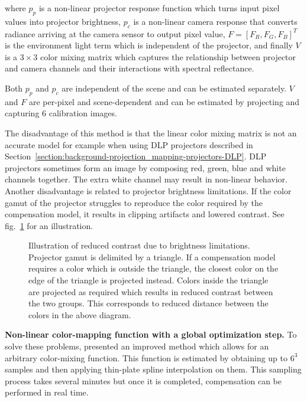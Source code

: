 where \(p_p\) is a non-linear projector response function which turns input pixel values into projector brightness, \(p_c\) is a non-linear camera response that converts radiance arriving at the camera sensor to output pixel value, \(F = [F_R, F_G, F_B]^T\) is the environment light term which is independent of the projector, and finally \(V\) is a \(3 \times 3\) color mixing matrix which captures the relationship between projector and camera channels and their interactions with spectral reflectance.

Both \(p_p\) and \(p_c\) are independent of the scene and can be estimated separately. \(V\) and \(F\) are per-pixel and scene-dependent and can be estimated by projecting and capturing 6 calibration images.

The disadvantage of this method is that the linear color mixing matrix is not an accurate model for example when using DLP projectors described in Section~\ref{section:background-projection_mapping-projectors-DLP}. DLP projectors sometimes form an image by composing red, green, blue and white channels together. The extra white channel may result in non-linear behavior. Another disadvantage is related to projector brightness limitations. If the color gamut of the projector struggles to reproduce the color required by the compensation model, it results in clipping artifacts and lowered contrast. See fig.~\ref{fig:background_clipping} for an illustration.

\begin{figure}[ht]
    \centering
    \def\svgwidth{0.4\textwidth}
    
    \caption{Illustration of reduced contrast due to brightness limitations. Projector gamut is delimited by a triangle. If a compensation model requires a color which is outside the triangle, the closest color on the edge of the triangle is projected instead. Colors inside the triangle are projected as required which results in reduced contrast between the two groups. This corresponds to reduced distance between the colors in the above diagram.}
    \label{fig:background_clipping}
\end{figure}

\textbf{Non-linear color-mapping function with a global optimization step.} To solve these problems, \citet{Grundhofer2015} presented an improved method which allows for an arbitrary color-mixing function. This function is estimated by obtaining up to \(6^3\) samples and then applying thin-plate spline interpolation on them. This sampling process takes several minutes but once it is completed, compensation can be performed in real time.


